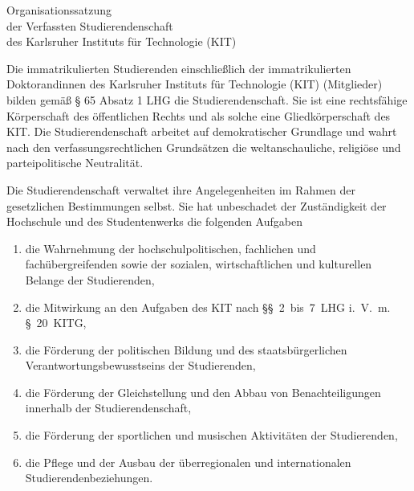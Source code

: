 

\begin{jurdoc}[Organisationssatzung]{Organisationssatzung\\der Verfassten Studierendenschaft\\des Karlsruher Instituts für Technologie (KIT)}
\setcounter{juratoclevel}{2}

%
%
Die immatrikulierten Studierenden einschließlich der immatrikulierten Doktorandinnen des Karlsruher Instituts für Technologie (KIT) (Mitglieder) bilden gemäß § 65 Absatz 1 LHG die Studierendenschaft. Sie ist eine rechtsfähige Körperschaft des öffentlichen Rechts und als solche eine Gliedkörperschaft des KIT. Die Studierendenschaft arbeitet auf demokratischer Grundlage und wahrt nach den verfassungsrechtlichen Grundsätzen die weltanschauliche, religiöse und parteipolitische Neutralität.


\label{studierendenschaft:aufgaben}

Die Studierendenschaft verwaltet ihre Angelegenheiten im Rahmen der gesetzlichen Bestimmungen selbst. Sie hat unbeschadet der Zuständigkeit der Hochschule und des Studentenwerks die folgenden Aufgaben
\begin{enumerate}
\item die Wahrnehmung der hochschulpolitischen, fachlichen und fachübergreifenden sowie der sozialen, wirtschaftlichen und kulturellen Belange der Studierenden,
\item die Mitwirkung an den Aufgaben des KIT nach §§~2~bis~7~LHG i.~V.~m. §~20~KITG,
\item die Förderung der politischen Bildung und des staatsbürgerlichen Verantwortungsbewusstseins der Studierenden,
\item die Förderung der Gleichstellung und den Abbau von Benachteiligungen innerhalb der Studierendenschaft,
\item die Förderung der sportlichen und musischen Aktivitäten der Studierenden,
\item die Pflege und der Ausbau der überregionalen und internationalen Studierendenbeziehungen.
\end{enumerate}

\label{studierendenschaft:mitglieder}


\end{jurdoc}
